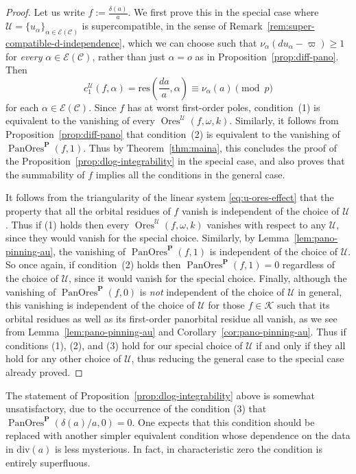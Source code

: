 \documentclass[preprint,12pt]{elsarticle}
\numberwithin{equation}{section} %
\theoremstyle{theorem}
\theoremstyle{definition}
\newcommand{\Ca}{\mathcal{C}} %
\newcommand{\bk}{\mathcal{K}} %
\newcommand{\ec}{\mathcal{E}} %
\newcommand{\idec}{{o}} %
\DeclareMathOperator{\ores}{Ores}
\DeclareMathOperator{\pano}{PanOres}
\begin{document}
\begin{proof}
     Let us write $f:=\frac{\delta(a)}{a}$. We first prove this in the special case where $\mathcal{U}=\{u_\alpha\}_{\alpha\in\ec(\Ca)}$ is supercompatible, in the sense of Remark~\ref{rem:super-compatible-d-independence}, which we can choose such that $\nu_\alpha(du_\alpha-\varpi)\geq 1$ for \emph{every} $\alpha\in\ec(\Ca)$, rather than just $\alpha=\idec$ as in Proposition~\ref{prop:diff-pano}. Then \[c^\mathcal{U}_1(f,\alpha)=\mathrm{res}\left(\frac{da}{a},\alpha\right)\equiv\nu_\alpha(a) \pmod{p}\] for each $\alpha\in\ec(\Ca)$. Since $f$ has at worst first-order poles, condition~(1) is equivalent to the vanishing of every $\ores^\mathcal{U}(f,\omega,k)$. Similarly, it follows from Proposition~\ref{prop:diff-pano} that condition~(2) is equivalent to the vanishing of $\pano^\mathbf{P}(f,1)$. Thus by Theorem~\ref{thm:maina}, this concludes the proof of the Proposition~\ref{prop:dlog-integrability} in the special case, and also proves that the summability of $f$ implies all the conditions in the general case.
     
      It follows from the triangularity of the linear system \eqref{eq:u-ores-effect} that the property that all the orbital residues of $f$ vanish is independent of the choice of $\mathcal{U}$. Thus if (1) holds then every $\ores^\mathcal{U}(f,\omega,k)$ vanishes with respect to any $\mathcal{U}$, since they would vanish for the special choice. Similarly, by Lemma~\ref{lem:pano-pinning-au}, the vanishing of $\pano^\mathbf{P}(f,1)$ is independent of the choice of $\mathcal{U}$. So once again, if condition~(2) holds then $\pano^\mathbf{P}(f,1)=0$ regardless of the choice of $\mathcal{U}$, since it would vanish for the special choice. Finally, although the vanishing of $\pano^\mathbf{P}(f,0)$ is \emph{not} independent of the choice of $\mathcal{U}$ in general, this vanishing is independent of the choice of $\mathcal{U}$ for those $f\in\bk$ such that its orbital residues as well as its first-order panorbital residue all vanish, as we see from Lemma~\ref{lem:pano-pinning-au} and Corollary~\ref{cor:pano-pinning-au}. Thus if conditions (1), (2), and (3) hold for our special choice of $\mathcal{U}$ if and only if they all hold for any other choice of $\mathcal{U}$, thus reducing the general case to the special case already proved.
    \end{proof}
    
    The statement of Proposition~\ref{prop:dlog-integrability} above is somewhat unsatisfactory, due to the occurrence of the condition (3) that $\pano^\mathbf{P}(\delta(a)/a,0)=0$. One expects that this condition should be replaced with another simpler equivalent condition whose dependence on the data in $\mathrm{div}(a)$ is less mysterious. In fact, in characteristic zero the condition is entirely superfluous.
\end{document}

